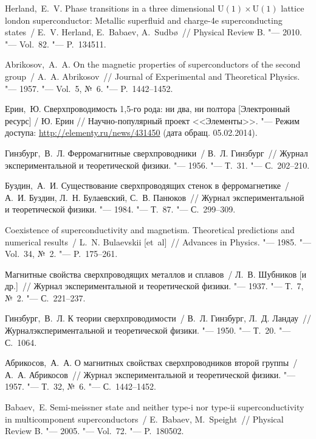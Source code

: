 \begin{thebibliography}{10}
     Herland,~E.~V. Phase transitions in a three dimensional
        \( \mathrm{U(1)\times U(1)} \) lattice london superconductor:
        Metallic superfluid and charge-4e superconducting states~/
        E.~V. Herland, E.~Babaev, A.~Sudb\o{}~// Physical Review B. "---
        2010. "--- Vol.~82. "--- P.~134511.

     Abrikosov,~A.~A. On the magnetic properties of
        superconductors of the second group~/ A.~A. Abrikosov~//
        Journal of Experimental and Theoretical Physics. "--- 1957. "---
        Vol.~5, №~6. "--- P.~1442--1452.

     Ерин,~Ю. Сверхпроводимость 1,5-го рода:
        ни два, ни полтора [Электронный ресурс] / Ю. Ерин //
        Научно-популярный проект <<Элементы>>. "--- Режим доступа:
        \url{http://elementy.ru/news/431450} (дата обращ. 05.02.2014).

     Гинзбург,~В.~Л. Ферромагнитные сверхпроводники~/
        В.~Л. Гинзбург~// Журнал экспериментальной и теоретической физики. "---
        1956. "--- Т.~31. "--- С.~202--210.

     Буздин,~А.~И. Существование сверхпроводящих стенок в
        ферромагнетике~/ А.~И. Буздин, Л.~Н. Булаевский, С.~В. Панюков~//
        Журнал экспериментальной и теоретической физики. "--- 1984. "---
        Т.~87. "--- С.~299--309.

     Coexistence of superconductivity and magnetism.
        Theoretical predictions and numerical results~/ L.~N. Bulaevskii [et~al]~//
        Advances in Physics. "--- 1985. "--- Vol.~34, №~2. "--- P.~175--261.

     Магнитные свойства сверхпроводящих металлов и
        сплавов~/ Л.~В. Шубников [и др.]~// Журнал экспериментальной и
        теоретической физики. "---
        1937. "--- Т.~7, №~2. "--- С.~221--237.

     Гинзбург,~В.~Л. К теории сверхпроводимости~/
        В.~Л. Гинзбург, Л.~Д. Ландау~// Журналэкспериментальной и теоретической
        физики. "--- 1950. "--- Т.~20. "--- С.~1064.

     Абрикосов,~А.~А. О магнитных свойствах
        сверхпроводников второй группы~/ А.~А. Абрикосов~//
        Журнал экспериментальной и теоретической физики. "--- 1957. "---
        Т.~32, №~6. "--- С.~1442--1452.

     Babaev,~E. Semi-meissner state and neither type-i nor
        type-ii superconductivity in multicomponent superconductors~/
        E.~Babaev, M.~Speight~// Physical Review B. "--- 2005. "---
        Vol.~72. "--- P.~180502.


\end{thebibliography}
